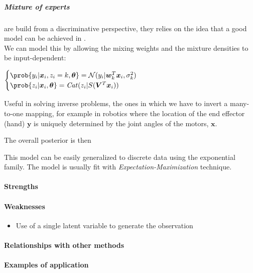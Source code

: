 \subparagraph{Mixture of experts}
are build from a discriminative perspective, they relies on the idea that a good
model can be achieved in .\\
We can model this by allowing the mixing weights and the mixture densities to be
input-dependent: 
\begin{center}
    $\begin{cases}
        \prob{y_{i}|\bm{x}_{i},z_{i}=k,\bm{\theta}} = \mathcal{N}(y_{i}|\bm{w}_{k}^{T}
        \bm{x}_{i},\sigma_{k}^{2}) \\
        \prob{z_{i}|\bm{x}_{i},\bm{\theta}} = \text{\emph{Cat}}(z_{i}|S(\bm{V}^{T}
        \bm{x}_{i}))
    \end{cases}$
\end{center}
Useful in solving inverse problems, the ones in which we have to invert a many-to-one
mapping, for example in robotics where the location of the end effector (hand) $\bm{y}$
is uniquely determined by the joint angles of the motors, $\bm{x}$.

The overall posterior is then
\begin{center}
\end{center}
 This model can be easily generalized to discrete data using the exponential family.
The model is usually fit with \emph{Expectation-Maximization} technique.
\paragraph{Strengths}

\paragraph{Weaknesses}
\begin{itemize}
    \item Use of a single latent variable to generate the observation
\end{itemize}

\paragraph{Relationships with other methods}
\paragraph{Examples of application}


